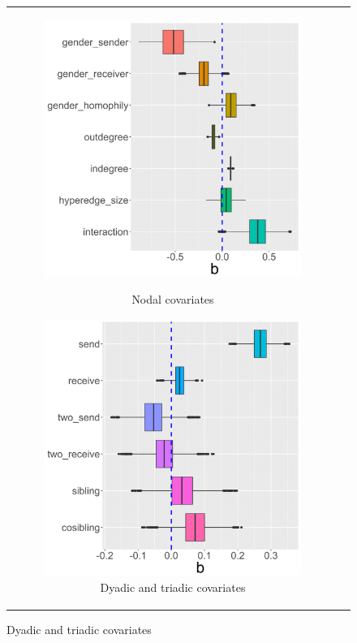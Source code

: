 \documentclass[ba]{imsart}
\numberwithin{equation}{section}
\theoremstyle{plain}
\begin{document}
			\begin{figure}[!t]
				\centering
				\begin{tabular}[t]{cc}
					\begin{subfigure}[b]{0.4975\textwidth}
						\caption{Nodal covariates}
						\includegraphics[width=\textwidth]{img/betanewplot2-1.png}
						\label{subfigure:betaresults1}	
					\end{subfigure}
					\begin{subfigure}[b]{0.4975\textwidth}
						\caption{Dyadic and triadic covariates}
						\includegraphics[width=\textwidth]{img/betanewplot3-1.png}

\end{subfigure}
\end{tabular}
\end{figure}
\end{document}
